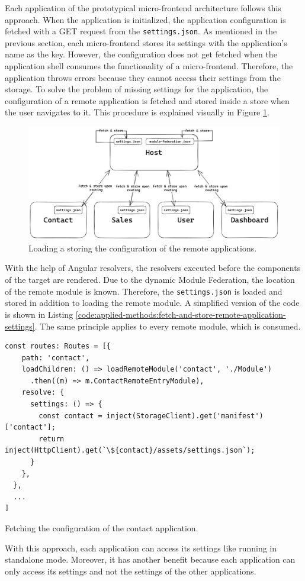 Each application of the prototypical micro-frontend architecture follows this approach. When the application is initialized, the application configuration is fetched with a GET request from the \texttt{settings.json}. As mentioned in the previous section, each micro-frontend stores its settings with the application's name as the key. However, the configuration does not get fetched when the application shell consumes the functionality of a micro-frontend. Therefore, the application throws errors because they cannot access their settings from the storage. To solve the problem of missing settings for the application, the configuration of a remote application is fetched and stored inside a store when the user navigates to it. This procedure is explained visually in Figure \ref{fig:applied-methods:load-remote-settings}.

\ifshowImages
  \begin{figure}[H]
  \centering
  \includegraphics[width=0.9\linewidth]{images/applied-methods/prototypical-implementation/load-remote-settings.png}
  \caption{Loading a storing the configuration of the remote applications.}\label{fig:applied-methods:load-remote-settings}
  \end{figure}
\fi

\noindent With the help of Angular resolvers, the resolvers executed before the components of the target are rendered. Due to the dynamic Module Federation, the location of the remote module is known. Therefore, the \texttt{settings.json} is loaded and stored in addition to loading the remote module. A simplified version of the code is shown in Listing \ref{code:applied-methods:fetch-and-store-remote-application-settings}. The same principle applies to every remote module, which is consumed.

\ifshowListings
\begin{listing}[H]
\begin{verbatim}
const routes: Routes = [{
    path: 'contact',
    loadChildren: () => loadRemoteModule('contact', './Module')
      .then((m) => m.ContactRemoteEntryModule),
    resolve: {
      settings: () => {
        const contact = inject(StorageClient).get('manifest')['contact'];
        return inject(HttpClient).get(`\${contact}/assets/settings.json`);
      }
    },
  },
  ...
]
\end{verbatim}
\caption{Fetching the configuration of the contact application.}\label{code:applied-methods:fetch-and-store-remote-application-settings}
\end{listing}
\fi

\noindent With this approach, each application can access its settings like running in standalone mode. Moreover, it has another benefit because each application can only access its settings and not the settings of the other applications. 
